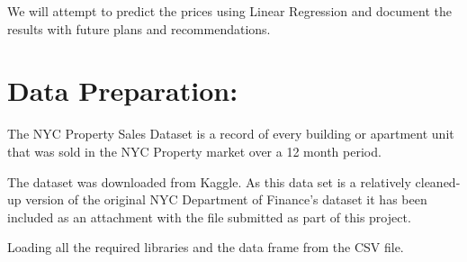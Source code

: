 \documentclass[
  a3paper,
]{article}
\begin{document}
We will attempt to predict the prices using Linear Regression and
document the results with future plans and recommendations.

\hypertarget{data-preparation}{%
\section{\texorpdfstring{\textbf{Data
Preparation:}}{Data Preparation:}}\label{data-preparation}}

The NYC Property Sales Dataset is a record of every building or
apartment unit that was sold in the NYC Property market over a 12 month
period.

The dataset was downloaded from Kaggle. As this data set is a relatively
cleaned- up version of the original NYC Department of Finance's dataset
it has been included as an attachment with the file submitted as part of
this project.

Loading all the required libraries and the data frame from the CSV file.
\end{document}
